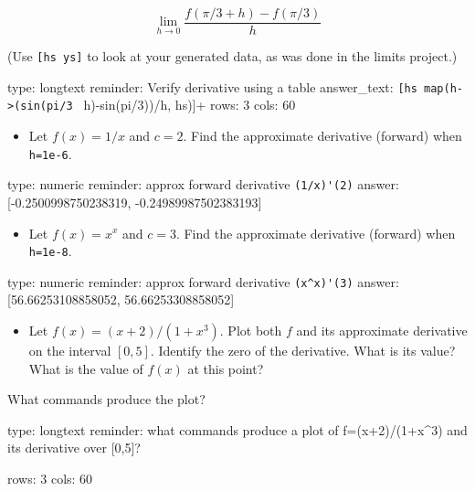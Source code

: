 \documentclass[12pt]{article}
\begin{document}
\[
\lim_{h \rightarrow 0} \frac{f(\pi/3 + h) - f(\pi/3)}{h}
\]

(Use \texttt{{[}hs ys{]}} to look at your generated data, as was done in
the limits project.)

\begin{answer}
type: longtext
reminder: Verify derivative using a table
answer_text: \verb+[hs map(h->(sin(pi/3 + h)-sin(pi/3))/h, hs)]+ 
rows: 3
cols: 60
\end{answer}

\begin{itemize}
\itemsep1pt\parskip0pt
\item
  Let $f(x) = 1/x$ and $c=2$. Find the approximate derivative (forward)
  when \texttt{h=1e-6}.
\end{itemize}

\begin{answer}
    type: numeric
    reminder: approx forward derivative \verb+(1/x)'(2)+
    answer: [-0.2500998750238319, -0.24989987502383193]

\end{answer}

\begin{itemize}
\itemsep1pt\parskip0pt
\item
  Let $f(x) = x^x$ and $c=3$. Find the approximate derivative (forward)
  when \texttt{h=1e-8}.
\end{itemize}

\begin{answer}
    type: numeric
    reminder: approx forward derivative \verb+(x^x)'(3)+
    answer: [56.66253108858052, 56.66253308858052]

\end{answer}

\begin{itemize}
\itemsep1pt\parskip0pt
\item
  Let $f(x) = (x + 2)/(1 + x^3)$. Plot both $f$ and its approximate
  derivative on the interval $[0,5]$. Identify the zero of the
  derivative. What is its value? What is the value of $f(x)$ at this
  point?
\end{itemize}

What commands produce the plot?

\begin{answer}
type: longtext
reminder: what commands produce a plot of f=(x+2)/(1+x^3) and its derivative over [0,5]?

rows: 3
cols: 60
\end{answer}
\end{document}
